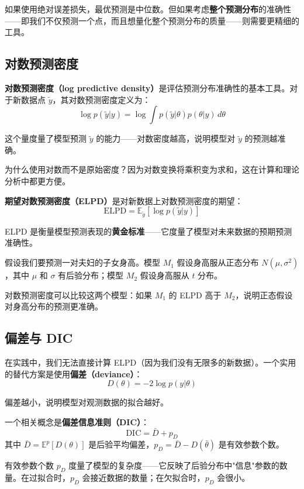 如果使用绝对误差损失，最优预测是中位数。但如果考虑\textbf{整个预测分布}的准确性——即我们不仅预测一个点，而且想量化整个预测分布的质量——则需要更精细的工具。

\subsection{对数预测密度}

\textbf{对数预测密度（log predictive density）}是评估预测分布准确性的基本工具。对于新数据点 $\tilde{y}$，其对数预测密度定义为：
\[
\log p(\tilde{y} | y) = \log \int p(\tilde{y} | \theta) p(\theta | y) \, d\theta
\]

这个量度量了模型预测 $\tilde{y}$ 的能力——对数密度越高，说明模型对 $\tilde{y}$ 的预测越准确。

为什么使用对数而不是原始密度？因为对数变换将乘积变为求和，这在计算和理论分析中都更方便。

\textbf{期望对数预测密度（ELPD）}是对新数据上对数预测密度的期望：
\[
\text{ELPD} = \mathbb{E}_{\tilde{y}}[\log p(\tilde{y} | y)]
\]

ELPD 是衡量模型预测表现的\textbf{黄金标准}——它度量了模型对未来数据的预期预测准确性。

\begin{Example}[子女身高预测]
  假设我们要预测一对夫妇的子女身高。模型 $M_1$ 假设身高服从正态分布 $N(\mu, \sigma^2)$，其中 $\mu$ 和 $\sigma$ 有后验分布；模型 $M_2$ 假设身高服从 $t$ 分布。

  对数预测密度可以比较这两个模型：如果 $M_1$ 的 ELPD 高于 $M_2$，说明正态假设对身高分布的预测更准确。
\end{Example}

\subsection{偏差与 DIC}

在实践中，我们无法直接计算 ELPD（因为我们没有无限多的新数据）。一个实用的替代方案是使用\textbf{偏差（deviance）}：
\[
D(\theta) = -2 \log p(y | \theta)
\]

偏差越小，说明模型对观测数据的拟合越好。

一个相关概念是\textbf{偏差信息准则（DIC）}：
\[
\text{DIC} = \bar{D} + p_D
\]
其中 $\bar{D} = \mathbb{E}^p[D(\theta)]$ 是后验平均偏差，$p_D = \bar{D} - D(\bar{\theta})$ 是有效参数个数。

有效参数个数 $p_D$ 度量了模型的复杂度——它反映了后验分布中"信息"参数的数量。在过拟合时，$p_D$ 会接近数据的数量；在欠拟合时，$p_D$ 会很小。

